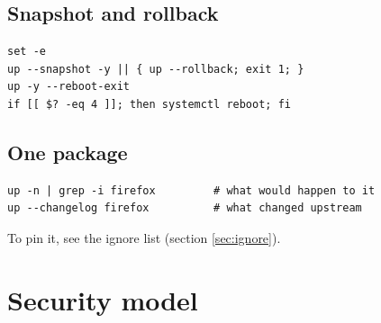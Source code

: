 \documentclass[11pt,a4paper]{article}
\begin{document}
\subsection{Snapshot and rollback}

\begin{lstlisting}[language=bashplus]
set -e
up --snapshot -y || { up --rollback; exit 1; }
up -y --reboot-exit
if [[ $? -eq 4 ]]; then systemctl reboot; fi
\end{lstlisting}

\subsection{One package}
\begin{lstlisting}[language=bashplus]
up -n | grep -i firefox         # what would happen to it
up --changelog firefox          # what changed upstream
\end{lstlisting}

To pin it, see the ignore list (section \ref{sec:ignore}).

\section{Security model}\label{sec:security}
\end{document}
